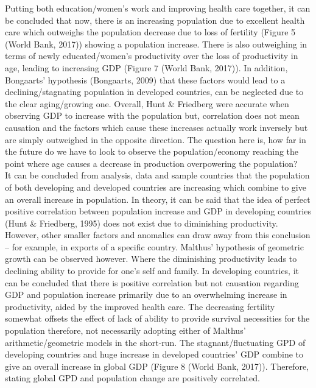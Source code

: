 \documentclass[11pt, english]{article}
\begin{document}
	Putting both education/women's work and improving health care together, it can be concluded that now, there is an increasing population due to excellent health care which outweighs the population decrease due to loss of fertility (Figure 5 (World Bank, 2017)) showing a population increase. There is also outweighing in terms of newly educated/women's productivity over the loss of productivity in age, leading to increasing GDP (Figure 7 (World Bank, 2017)). In addition, Bongaarts' hypothesis (Bongaarts, 2009) that these factors would lead to a declining/stagnating population in developed countries, can be neglected due to the clear aging/growing one. Overall, Hunt \& Friedberg were accurate when observing GDP to increase with the population but, correlation does not mean causation and the factors which cause these increases actually work inversely but are simply outweighed in the opposite direction. The question here is, how far in the future do we have to look to observe the population/economy reaching the point where age causes a decrease in production overpowering the population?\\

	It can be concluded from analysis, data and sample countries that the population of both developing and developed countries are increasing which combine to give an overall increase in population. In theory, it can be said that the idea of perfect positive correlation between population increase and GDP in developing countries (Hunt \& Friedberg, 1995) does not exist due to diminishing productivity. However, other smaller factors and anomalies can draw away from this conclusion – for example, in exports of a specific country. Malthus' hypothesis of geometric growth can be observed however. Where the diminishing productivity leads to declining ability to provide for one's self and family. In developing countries, it can be concluded that there is positive correlation but not causation regarding GDP and population increase primarily due to an overwhelming increase in productivity, aided by the improved health care. The decreasing fertility somewhat offsets the effect of lack of ability to provide survival necessities for the population therefore, not necessarily adopting either of Malthus' arithmetic/geometric models in the short-run. The stagnant/fluctuating GPD of developing countries and huge increase in developed countries' GDP combine to give an overall increase in global GDP (Figure 8 (World Bank, 2017)). Therefore, stating global GPD and population change are positively correlated.
\end{document}
